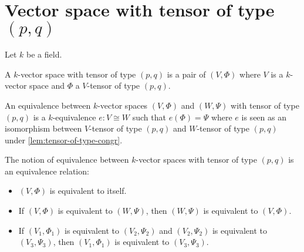 \section{Vector space with tensor of type $(p,q)$}

Let $k$ be a field.

\begin{definition}
  A $k$-vector space with tensor of type $(p, q)$ is a pair of $(V, \Phi)$ where $V$ is a $k$-vector space and $\Phi$ a $V$-tensor of type $(p, q)$.
  \leanok%
\end{definition}

\begin{definition}
  An equivalence between $k$-vector spaces $(V, \Phi)$ and $(W, \Psi)$ with tensor of type $(p, q)$ is a $k$-equivalence $e : V \cong W$ such that $e(\Phi) = \Psi$ where $e$ is seen as an isomorphism between $V$-tensor of type $(p, q)$ and $W$-tensor of type $(p, q)$ under \cref{lem:tensor-of-type-congr}.
  \leanok%
\end{definition}

\begin{lemma}
  The notion of equivalence between $k$-vector spaces with tensor of type $(p, q)$ is an equivalence relation:
  \begin{itemize}
    \item $(V, \Phi)$ is equivalent to itself.
    \item If $(V, \Phi)$ is equivalent to $(W, \Psi)$, then $(W, \Psi)$ is equivalent to $(V, \Phi)$.
    \item If $(V_{1}, \Phi_{1})$ is equivalent to $(V_{2}, \Psi_{2})$ and $(V_{2}, \Psi_{2})$ is equivalent to $(V_{3}, \Psi_{3})$, then $(V_{1}, \Phi_{1})$ is equivalent to $(V_{3}, \Psi_{3})$.
  \end{itemize}
  \leanok%
\end{lemma}

